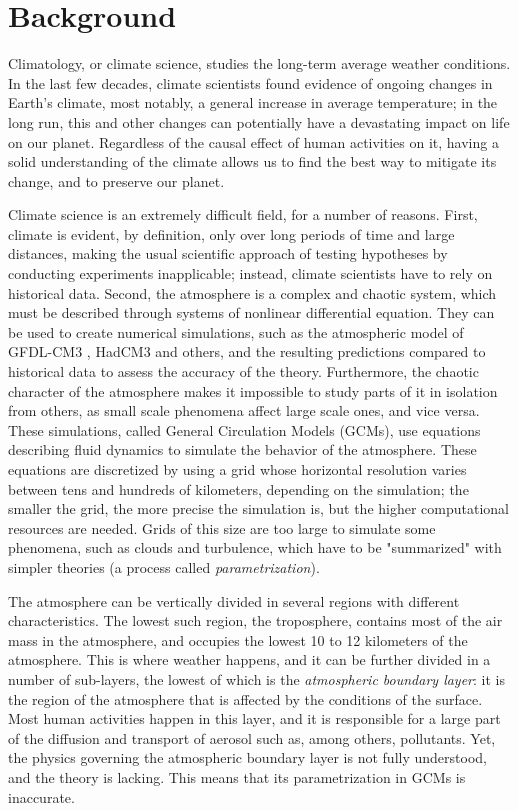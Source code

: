 \documentclass[a4paper,11pt]{kth-mag}
\begin{document}
\section{Background}
\label{sec:intro_bg}
Climatology, or climate science, studies the long-term average weather conditions. In the last few decades, climate scientists found evidence of ongoing changes in Earth's climate, most notably, a general increase in average temperature; in the long run, this and other changes can potentially have a devastating impact on life on our planet. Regardless of the causal effect of human activities on it, having a solid understanding of the climate allows us to find the best way to mitigate its change, and to preserve our planet.

Climate science is an extremely difficult field, for a number of reasons. First, climate is evident, by definition, only over long periods of time and large distances, making the usual scientific approach of testing hypotheses by conducting experiments inapplicable; instead, climate scientists have to rely on historical data. Second, the atmosphere is a complex and chaotic system, which must be described through systems of nonlinear differential equation. They can be used to create numerical simulations, such as the atmospheric model of GFDL-CM3 \citep{gfdl_am3}, HadCM3 \citep{hadcm3} and others, and the resulting predictions compared to historical data to assess the accuracy of the theory. Furthermore, the chaotic character of the atmosphere makes it impossible to study parts of it in isolation from others, as small scale phenomena affect large scale ones, and vice versa. These simulations, called General Circulation Models (GCMs), use equations describing fluid dynamics to simulate the behavior of the atmosphere. These equations are discretized by using a grid whose horizontal resolution varies between tens and hundreds of kilometers, depending on the simulation; the smaller the grid, the more precise the simulation is, but the higher computational resources are needed. Grids of this size are too large to simulate some phenomena, such as clouds and turbulence, which have to be "summarized" with simpler theories (a process called \emph{parametrization}).

The atmosphere can be vertically divided in several regions with different characteristics. The lowest such region, the troposphere, contains most of the air mass in the atmosphere, and occupies the lowest 10 to 12 kilometers of the atmosphere. This is where weather happens, and it can be further divided in a number of sub-layers, the lowest of which is the \emph{atmospheric boundary layer}: it is the region of the atmosphere that is affected by the conditions of the surface. Most human activities happen in this layer, and it is responsible for a large part of the diffusion and transport of aerosol such as, among others, pollutants. Yet, the physics governing the atmospheric boundary layer is not fully understood, and the theory is lacking. This means that its parametrization in GCMs is inaccurate.
\end{document}
